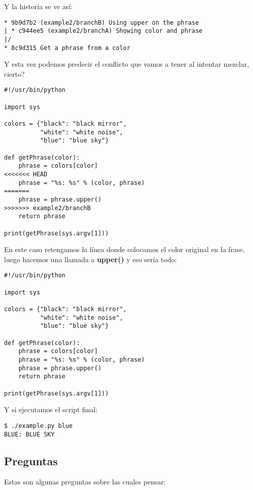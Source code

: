 Y la historia se ve así:
\begin{lstlisting}[style=console_style, caption={\bf Ejemplo 2} - historia de las ramas]
* 9b9d7b2 (example2/branchB) Using upper on the phrase
| * c944ee5 (example2/branchA) Showing color and phrase
|/  
* 8c9d315 Get a phrase from a color
\end{lstlisting}

Y esta vez podemos predecir el conflicto que vamos a tener al intentar mezclar, cierto?
\begin{lstlisting}[style=python_style, caption={\bf Ejemplo 2} - Archivo en conflicto]
#!/usr/bin/python

import sys

colors = {"black": "black mirror",
          "white": "white noise",
          "blue": "blue sky"}

def getPhrase(color):
    phrase = colors[color]
<<<<<<< HEAD
    phrase = "%s: %s" % (color, phrase)
=======
    phrase = phrase.upper()
>>>>>>> example2/branchB
    return phrase

print(getPhrase(sys.argv[1]))
\end{lstlisting}

En este caso retengamos la línea donde colocamos el color original en la frase, luego hacemos una llamada a {\bf upper()}
y eso sería todo:
\begin{lstlisting}[style=python_style, caption={\bf Ejemplo 2} - Conflicto resuelto]
#!/usr/bin/python

import sys

colors = {"black": "black mirror",
          "white": "white noise",
          "blue": "blue sky"}

def getPhrase(color):
    phrase = colors[color]
    phrase = "%s: %s" % (color, phrase)
    phrase = phrase.upper()
    return phrase

print(getPhrase(sys.argv[1]))
\end{lstlisting}

Y si ejecutamos el script final:
\begin{lstlisting}[style=console_style, caption={\bf Ejemplo 2} - ejecutando el script final]
$ ./example.py blue
BLUE: BLUE SKY
\end{lstlisting}

\subsection{Preguntas}
Estas son algunas preguntas sobre las cuales pensar:

